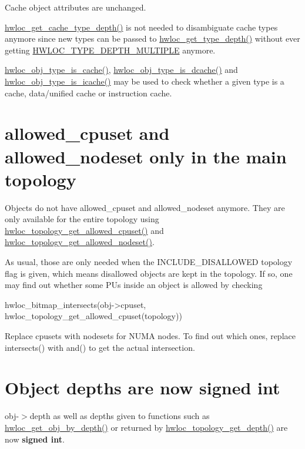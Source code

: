 Cache object attributes are unchanged.

\hyperlink{a00199_gad108a09ce400222fe45545257d575489}{hwloc\+\_\+get\+\_\+cache\+\_\+type\+\_\+depth()} is not needed to disambiguate cache types anymore since new types can be passed to \hyperlink{a00187_ga8bec782e21be313750da70cf7428b374}{hwloc\+\_\+get\+\_\+type\+\_\+depth()} without ever getting \hyperlink{a00187_ggaf4e663cf42bbe20756b849c6293ef575ae99465995cacde6c210d5fc2e409798c}{H\+W\+L\+O\+C\+\_\+\+T\+Y\+P\+E\+\_\+\+D\+E\+P\+T\+H\+\_\+\+M\+U\+L\+T\+I\+P\+LE} anymore.

\hyperlink{a00198_ga2ed589bea28711e80b92066510a5607d}{hwloc\+\_\+obj\+\_\+type\+\_\+is\+\_\+cache()}, \hyperlink{a00198_ga395e48cd221d107e5891689624e1aec4}{hwloc\+\_\+obj\+\_\+type\+\_\+is\+\_\+dcache()} and \hyperlink{a00198_ga8abcee67b9b074332c1866405a3648a9}{hwloc\+\_\+obj\+\_\+type\+\_\+is\+\_\+icache()} may be used to check whether a given type is a cache, data/unified cache or instruction cache.

 \hypertarget{a00395_upgrade_to_api_2x_allowed}{}\section{allowed\+\_\+cpuset and allowed\+\_\+nodeset only in the main topology}\label{a00395_upgrade_to_api_2x_allowed}
Objects do not have {\ttfamily allowed\+\_\+cpuset} and {\ttfamily allowed\+\_\+nodeset} anymore. They are only available for the entire topology using \hyperlink{a00202_ga517d5d68ec9f24583d8933aab713be8e}{hwloc\+\_\+topology\+\_\+get\+\_\+allowed\+\_\+cpuset()} and \hyperlink{a00202_ga21a4d7237a11e76b912ed4524ab78cbd}{hwloc\+\_\+topology\+\_\+get\+\_\+allowed\+\_\+nodeset()}.

As usual, those are only needed when the I\+N\+C\+L\+U\+D\+E\+\_\+\+D\+I\+S\+A\+L\+L\+O\+W\+ED topology flag is given, which means disallowed objects are kept in the topology. If so, one may find out whether some P\+Us inside an object is allowed by checking \begin{DoxyVerb}hwloc_bitmap_intersects(obj->cpuset, hwloc_topology_get_allowed_cpuset(topology))
\end{DoxyVerb}
 Replace cpusets with nodesets for N\+U\+MA nodes. To find out which ones, replace intersects() with and() to get the actual intersection.

 \hypertarget{a00395_upgrade_to_api_2x_depth}{}\section{Object depths are now signed int}\label{a00395_upgrade_to_api_2x_depth}
{\ttfamily obj-\/$>$depth} as well as depths given to functions such as \hyperlink{a00187_ga391f6b2613f0065673eaa4069b93d4e0}{hwloc\+\_\+get\+\_\+obj\+\_\+by\+\_\+depth()} or returned by \hyperlink{a00187_gae54d1782ca9b54bea915f5c18a9158fa}{hwloc\+\_\+topology\+\_\+get\+\_\+depth()} are now {\bfseries signed int}.

